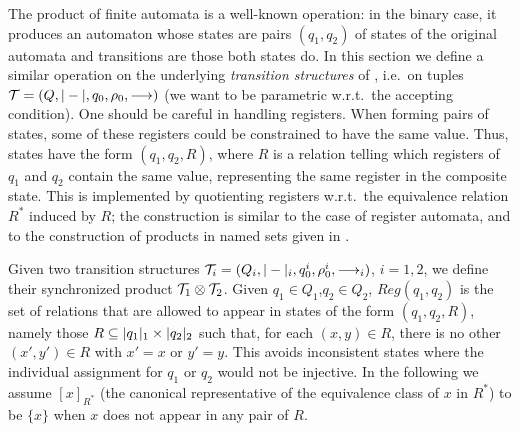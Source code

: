 \newcommand{\eq}[1]{#1}
\newcommand{\syncQ}{Q_{\syncp}}
\newcommand{\syncW}[1]{\weight{#1}_{\syncp}}
\newcommand{\syncAss}{\rho_0^{\syncp}}
\newcommand{\syncInit}{q_0^{\syncp}}
\newcommand{\syncTr}[1]{\xymatrix@C-=4ex{\ar[r]^{#1}&\!_{\syncp}}}
\newcommand{\syncHtr}[2]{\xymatrix@C-=4ex{\ar[r]^{#1}_{#2}&\!_{\syncp}}}
\newcommand{\regrule}{\textsc{(Reg)}}
\newcommand{\allrule}{\textsc{(Alloc)}}
\newcommand{\cproj}{\pi}

The product of finite automata is a well-known operation: in the binary case, it produces an automaton whose states are pairs $(q_1,q_2)$ of states of the original automata and transitions are those both states do. In this section we define a similar operation on the underlying \emph{transition structures} of \hdmas{}, i.e.\ on tuples $\mathcal{T} = (Q,|-|,q_0,\rho_0,\longrightarrow)$ (we want to be parametric w.r.t.\ the accepting condition). One should  be careful in handling registers. When forming pairs of states, some of these registers could be constrained to have the same value.
Thus, states have the form $(q_1,q_2,R)$, where $R$ is a relation telling which registers of $q_1$ and $q_2$ contain the same value, representing the same register in the composite state. This is implemented by quotienting registers w.r.t.\ the equivalence relation $R^*$ induced by $R$; the construction is similar to the case of register automata, and to the construction of products in named sets given in \cite{CianciaM10}.

Given two transition structures $\mathcal{T}_i = (Q_i,|-|_i,q_0^i,\rho_0^i,\longrightarrow_i)$, $i=1,2$, we define their synchronized product $\mathcal{T}_1 \otimes \mathcal{T}_2$. Given $q_1 \in Q_1$,$q_2 \in Q_2$, $Reg(q_1,q_2)$ is the set of relations that are allowed to appear in states of the form $(q_1,q_2,R)$, namely those $R \subseteq |q_1|_1 \times |q_2|_2$ such that, for each $(x,y) \in R$, there is no other $(x',y') \in R$ with $x'=x$ or $y'=y$. This avoids inconsistent states where the individual assignment for $q_1$ or $q_2$ would not be injective. In the following we assume $[x]_{R^*}$ (the canonical representative of the equivalence class of $x$ in $R^*$) to be $\{x\}$ when $x$ does not appear in any pair of $R$.



